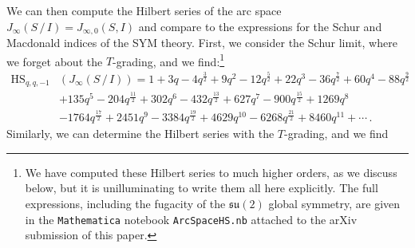 \documentclass[12pt]{article}
\numberwithin{equation}{section}
\numberwithin{figure}{section}
\theoremstyle{plain}
\theoremstyle{definition}
\begin{document}
We can then compute the Hilbert series of the arc space $J_\infty(S \, / \, I) = J_{\infty, 0}(S, I)$ and compare to the expressions for the Schur and Macdonald indices of the SYM theory. First, we consider the Schur limit, where we forget about the $T$-grading, and we find:\footnote{We have computed these Hilbert series to much higher orders, as we discuss below, but it is unilluminating to write them all here explicitly. The full expressions, including the fugacity of the $\mathfrak{su}(2)$ global symmetry, are given in the {\tt Mathematica} notebook {\tt ArcSpaceHS.nb} attached to the arXiv submission of this paper.}
\begin{equation}\label{eqn:N4HSS}
  \begin{aligned}
    \operatorname{HS}_{q,q,-1}&(J_{\infty}(S \, / \, I)) = 1 + 3 q - 4 q^\frac{3}{2} + 9 q^2 - 12 q^\frac{5}{2} + 22 q^3 - 36 q^\frac{7}{2} + 
 60 q^4 - 88 q^\frac{9}{2} \\&+ 135 q^5 - 204 q^\frac{11}{2} + 302 q^6 -432 q^\frac{13}{2} + 627 q^7 - 900 q^\frac{15}{2} + 1269 q^8 \\&-1764 q^\frac{17}{2} + 2451 q^9 - 3384 q^\frac{19}{2} + 4629 q^{10} - 6268q^\frac{21}{2} + 8460q^{11} + \cdots \,.
  \end{aligned}
\end{equation}
Similarly, we can determine the Hilbert series with the $T$-grading, and we find
\end{document}
